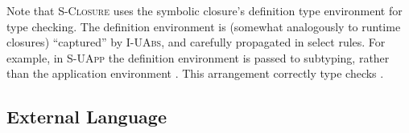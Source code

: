 Note that \textsc{S-Closure} uses the symbolic closure's definition type environment
for type checking. The definition environment is (somewhat analogously to runtime closures)
``captured'' by \textsc{I-UAbs},
and carefully propagated in select rules.
For example, in \textsc{S-UApp}
the definition environment \ltiEnvp{} is passed to subtyping,
rather than the application environment \ltiEnv{}.
This arrangement correctly type checks .

\subsection{External Language}

\begin{figure}
$$
\begin{array}{lrll}

\end{array}$$
\end{figure}
